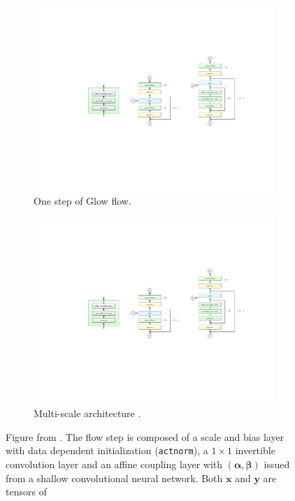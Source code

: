 \documentclass[11pt]{amsart}
\begin{document}
\begin{figure}
    \centering
    \vspace{-0cm}
    \begin{subfigure}[b]{0.45\textwidth}
    \begin{center}
        \centering
        \includegraphics[width=.7\textwidth]{fig-Glow-1.pdf}
        \caption{One step of Glow flow.}
    \end{center}
    \end{subfigure}%
    \vspace{5mm}
    \begin{subfigure}[b]{0.45\textwidth}
        \centering
        \includegraphics[width=.99\textwidth]{fig-Glow-2.pdf}
        \caption{Multi-scale architecture \citep{2016arXiv160508803D}.}
    \end{subfigure}
    \caption{Figure from \citep{Kingma2018}. The flow step is composed of a scale and bias layer with data dependent initialization (\texttt{actnorm}), a $1\times 1$ invertible convolution layer and an affine coupling layer with $(\bm{\alpha},\bm{\beta})$ issued from a shallow convolutional neural network. Both $\bm{x}$ and $\bm{y}$ are tensors of
}
\end{figure}
\end{document}
